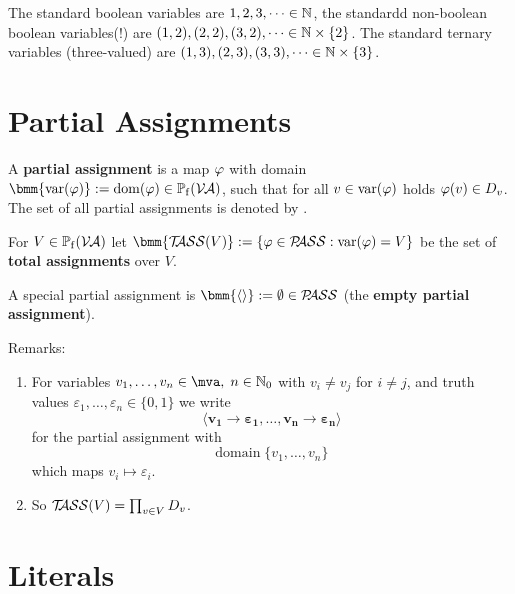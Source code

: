 \documentclass[12pt]{book}
\begin{document}
\begin{examp}\label{exp:var}
  The standard boolean variables are $1, 2, 3, \dots \in \mathbb{N}$, the standardd non-boolean boolean variables(!) are $(1,2), (2,2), (3,2), \dots \in \mathbb{N} \times \{ 2 \}$. The standard ternary variables (three-valued) are $(1,3), (2,3), (3,3), \dots \in \mathbb{N} \times \{ 3 \}$.
\end{examp}


\section{Partial Assignments}
\label{sec:Partialassignments}

\begin{defi}\label{def:Pass}
  A \textbf{partial assignment} is a map $\varphi$ with domain $\bmm{\var(\vp)} := \dom(\vp) \in \pote(\Va)$, such that for all $v \in \operatorname{var}(\varphi)$ holds $\varphi(v) \in D_v$. The set of all partial assignments is denoted by \bmm{\Pass}.

 For $V \in \operatorname{\mathbb{P}_f}(\mathcal{V\hspace{-0.1em}A})$ let $\bmm{\Tass(V)} := \set{\vp \in \Pass : \var(\vp) = V}$ be the set of \textbf{total assignments} over $V$.

  A special partial assignment is $\bmm{\epa} := \es \in \Pass$ (the \textbf{empty partial assignment}).
\end{defi}
Remarks:
\begin{enumerate}
\item For variables $v_1, \ldots, v_n \in \mva, \; n\in \mathbb{N}_0$ with $v_i \neq v_j$ for $i\neq j$, and truth values $\varepsilon_1, \ldots, \varepsilon_n \in \{0,1\}$ we write
\begin{displaymath}
\pmb{\langle v_1 \to \varepsilon_1, \ldots, v_n \to \varepsilon_n\rangle}
\end{displaymath}
for the partial assignment with
\begin{displaymath}
\mbox{domain} \; \{v_1, \ldots, v_n\}
\end{displaymath}
which maps $v_i \mapsto \varepsilon_i$.

\item So $\mathcal{T\hspace{-0.35em}ASS}(V) = \prod_{v \in V} D_v$.
\end{enumerate}

\section{Literals}
\label{sec:Litsvar}
\end{document}
